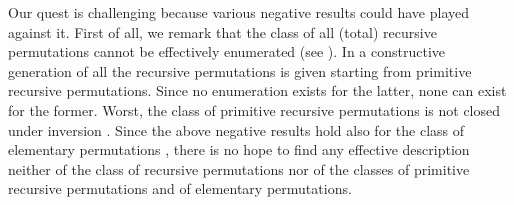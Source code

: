 \documentclass[runningheads]{llncs}
\begin{document}
Our quest is challenging because various negative results could have played  against it.
First of all, we remark that the class of all (total) recursive permutations
cannot be effectively enumerated (see \cite[Exercise 4-6, p.55]{rogers1967theory}).
In \cite{koz1972ail} a constructive generation of all the recursive permutations is given starting
from primitive recursive permutations. Since no enumeration exists for the latter, none can exist for the former.
Worst, the class of primitive recursive permutations is not closed under inversion \cite{kuznecov50sssr,PaoliniPiccoloRoversiICTCS2015,soare1987book}.
Since the above negative results hold also for the class of elementary permutations
\cite{cannonito1969jsl,kalimullin03permutations,koz1974ail}, there is no
hope to find any effective description neither of the class of recursive
permutations nor of the classes of primitive recursive permutations and of elementary permutations.
\end{document}
